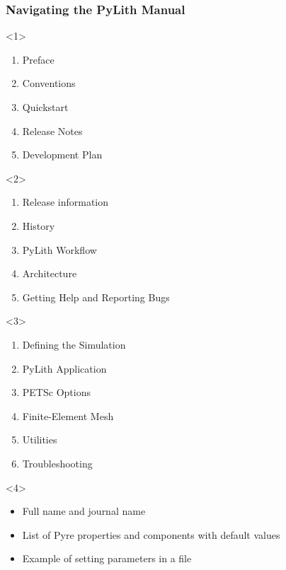 \documentclass[aspectratio=169]{beamer}
\begin{document}
\begin{frame}[t]
  \frametitle{Navigating the PyLith Manual}
  \summary{}

  \begin{itemize}
    \begin{onlyenv}<1>
      \begin{enumerate}
      \item Preface
      \item Conventions
      \item Quickstart
      \item Release Notes
      \item Development Plan
      \end{enumerate}
    \end{onlyenv}
    \begin{onlyenv}<2>
      \begin{enumerate}
      \item Release information
      \item History
      \item PyLith Workflow
      \item Architecture
      \item Getting Help and Reporting Bugs
      \end{enumerate}
    \end{onlyenv}
    \begin{onlyenv}<3>
      \begin{enumerate}
      \item Defining the Simulation
      \item PyLith Application
      \item PETSc Options
      \item Finite-Element Mesh
      \item Utilities
      \item Troubleshooting
      \end{enumerate}
    \end{onlyenv}
    \begin{onlyenv}<4>
      \begin{itemize}
      \item Full name and journal name
      \item List of Pyre properties and components with default values
      \item Example of setting parameters in a  file

\end{itemize}
\end{onlyenv}
\end{itemize}
\end{frame}
\end{document}
